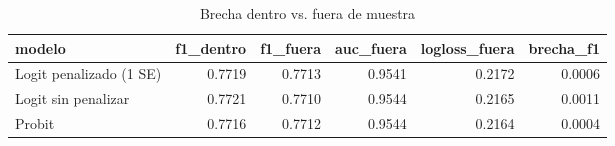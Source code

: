 \begin{table}[ht]
\centering
\begin{tabular}{lrrrrr}
  \hline
modelo & f1\_dentro & f1\_fuera & auc\_fuera & logloss\_fuera & brecha\_f1 \\ 
  \hline
Logit penalizado (1 SE) & 0.7719 & 0.7713 & 0.9541 & 0.2172 & 0.0006 \\ 
  Logit sin penalizar & 0.7721 & 0.7710 & 0.9544 & 0.2165 & 0.0011 \\ 
  Probit & 0.7716 & 0.7712 & 0.9544 & 0.2164 & 0.0004 \\ 
   \hline
\end{tabular}
\caption{Brecha dentro vs. fuera de muestra} 
\end{table}
